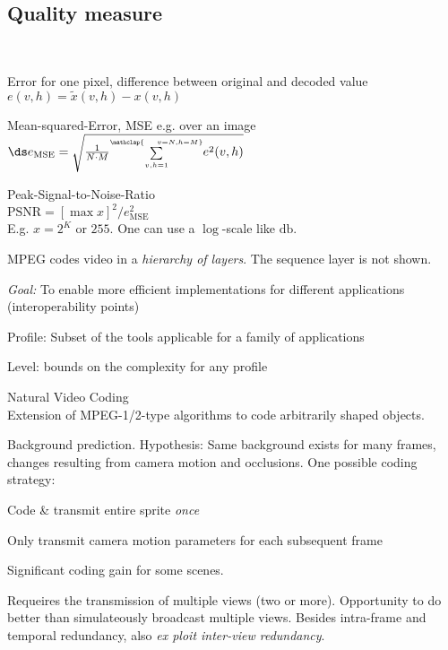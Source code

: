 \begin{compactdesc}
\section{Quality measure}
	\item[\lp{objective: PSNR}] \hfill\\
		\begin{itemize*}[label=\colorbullet]
			\item Error for one pixel, difference between original and decoded value\\
				$e(v,h)=\tilde{x}(v,h)-x(v,h)$\\
		\item Mean-squared-Error, MSE e.g. over an image\\
			$\ds e_{\text{MSE}}=\sqrt{\frac{1}{N\cdot M}{\scriptstyle\sum\limits_{v,h=1}^{\mathclap{\quad v=N,h=M}}}e^2(v,h)}$
		\item Peak-Signal-to-Noise-Ratio\\
			$\text{PSNR}=[\max x]^2/e_{\text{MSE}}^{2}$\\
			E.g. $x=2^K$ or $255$. One can use a $\log$-scale like $\si{\decibel}$.
		\end{itemize*}
	\item[\lp{MPEG Structure}] MPEG codes video in a \emph{hierarchy of layers}. The sequence layer is not shown.
	\item[\lp{MPEG-2}] \emph{Goal:} To enable more efficient implementations for different applications (interoperability points)\\
		\begin{itemize*}[label=\colorbullet]
			\item Profile: Subset of the tools applicable for a family of applications\\
			\item Level: bounds on the complexity for any profile
		\end{itemize*}
	\item[\lp{MPEG-4}] Natural Video Coding\\
		Extension of MPEG-1/2-type algorithms to code arbitrarily shaped objects.
	\item[\lp{Sprite Coding}] Background prediction. Hypothesis: Same background exists for many frames, changes resulting from camera motion and occlusions. One possible coding strategy:
		\begin{enumerate*}[label=\protect\circled{\arabic*},itemjoin=]
			\item Code \& transmit entire sprite \emph{once}\\
			\item Only transmit camera motion parameters for each subsequent frame
		\end{enumerate*}
		Significant coding gain for some scenes.
	\item[\lp{3D TV}] Requeires the transmission of multiple views (two or more). Opportunity to do better than simulateously broadcast multiple views. Besides intra-frame and temporal redundancy, also \emph{ex ploit inter-view redundancy}.
\end{compactdesc}
